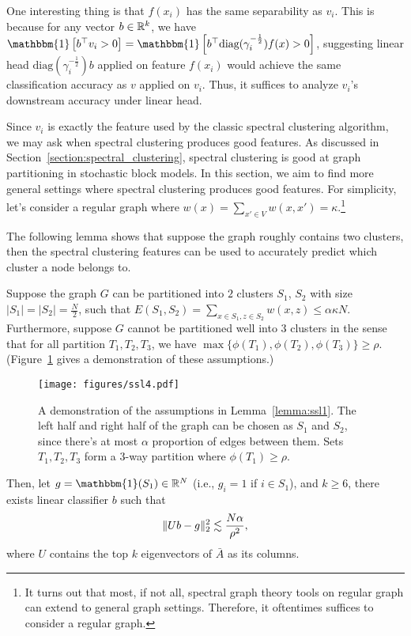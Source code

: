 \newcommand{\id}[1]{\mathbbm{1}\left[#1\right]}

One interesting thing is that $f(x_i)$ has the same separability as $v_i$. This is because for any vector $b\in\mathbb R^k$, we have $\id{b^\top v_i>0} = \id{b^\top \text{diag}(\gamma_i^{-\frac{1}{2}}) f(x) >0}$, suggesting linear head $\text{diag}(\gamma_i^{-\frac{1}{2}}) b$ applied on feature $f(x_i)$ would achieve the same classification accuracy as $v$ applied on $v_i$. Thus, it suffices to analyze $v_i$'s downstream accuracy under linear head.

Since $v_i$ is exactly the feature used by the classic spectral clustering algorithm, we may ask when spectral clustering produces good features. As discussed in Section~\ref{section:spectral_clustering}, spectral clustering is good at graph partitioning in stochastic block models. In this section, we aim to find more general settings where spectral clustering produces good features. For simplicity, let's consider a regular graph where $w(x) = \sum_{x'\in V} w(x, x') = \kappa$.\footnote{It turns out that most, if not all, spectral graph theory tools on regular graph can extend to general graph settings. Therefore, it oftentimes suffices to consider a regular graph. } %

The following lemma shows that suppose the graph roughly contains two clusters, then the spectral clustering features can be used to accurately predict which cluster a node belongs to.
\begin{lemma}\label{lemma:ssl1}
	Suppose the graph $G$ can be partitioned into $2$ clusters $S_1$, $S_2$ with size $|S_1| = |S_2| = \frac{N}{2}$, such that $E(S_1, S_2)=\sum_{x\in S_1, z\in S_2} w(x, z) \le \alpha \kappa N$. Furthermore, suppose $G$ cannot be partitioned well into $3$ clusters in the sense that for all partition $ T_1, T_2, T_3$, we have $\max\{\phi(T_1), \phi(T_2), \phi(T_3)\} \ge \rho$. (Figure~\ref{figure:ssl_thm_assumption} gives a demonstration of these assumptions.)
	\begin{figure}[ht]
		\centering
		\texttt{[image: figures/ssl4.pdf]}
		\caption{A demonstration of the assumptions in Lemma~\ref{lemma:ssl1}. The left half and right half of the graph can be chosen as $S_1$ and $S_2$, since there's at most $\alpha$ proportion of edges between them. Sets $T_1, T_2, T_3$ form a 3-way partition where $\phi(T_1)\ge \rho$.
		}\label{figure:ssl_thm_assumption}
	\end{figure}
	Then, let $g=\mathbbm{1}(S_1)\in \bbR^N$ (i.e., $g_i=1$ if $i\in S_1$), and $k\ge 6$, there exists linear classifier $b$ such that %
	\begin{align}
		\|Ub-g\|_2^2 \lesssim \frac{N\alpha}{\rho^2},
	\end{align}
where $U$ contains the top $k$ eigenvectors of $\bar{A}$ as its columns.
\end{lemma}

